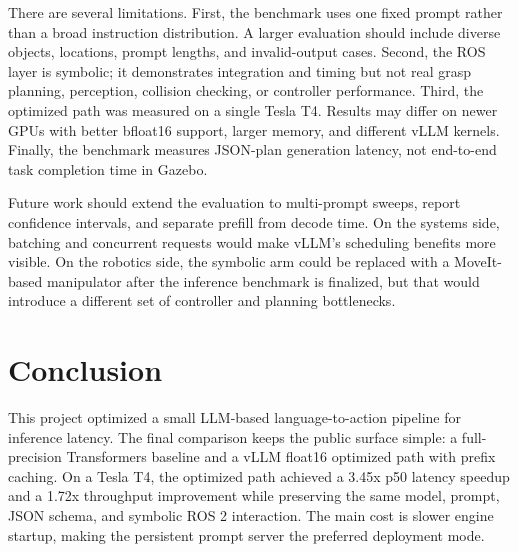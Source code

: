 \documentclass[conference]{IEEEtran}
\begin{document}
There are several limitations. First, the benchmark uses one fixed prompt rather than a broad instruction distribution. A larger evaluation should include diverse objects, locations, prompt lengths, and invalid-output cases. Second, the ROS layer is symbolic; it demonstrates integration and timing but not real grasp planning, perception, collision checking, or controller performance. Third, the optimized path was measured on a single Tesla T4. Results may differ on newer GPUs with better bfloat16 support, larger memory, and different vLLM kernels. Finally, the benchmark measures JSON-plan generation latency, not end-to-end task completion time in Gazebo.

Future work should extend the evaluation to multi-prompt sweeps, report confidence intervals, and separate prefill from decode time. On the systems side, batching and concurrent requests would make vLLM's scheduling benefits more visible. On the robotics side, the symbolic arm could be replaced with a MoveIt-based manipulator after the inference benchmark is finalized, but that would introduce a different set of controller and planning bottlenecks.

\section{Conclusion}

This project optimized a small LLM-based language-to-action pipeline for inference latency. The final comparison keeps the public surface simple: a full-precision Transformers baseline and a vLLM float16 optimized path with prefix caching. On a Tesla T4, the optimized path achieved a 3.45x p50 latency speedup and a 1.72x throughput improvement while preserving the same model, prompt, JSON schema, and symbolic ROS 2 interaction. The main cost is slower engine startup, making the persistent prompt server the preferred deployment mode.
\end{document}
